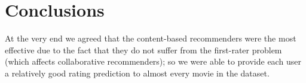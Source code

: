 \documentclass{acm_proc_article-sp}
\begin{document}
\section{Conclusions}
At the very end we agreed that the content-based recommenders were the most effective due to the fact that they do not suffer from the first-rater problem (which affects collaborative recommenders); so we were able to provide each user a relatively good rating prediction to almost every movie in the dataset.



\end{document}
